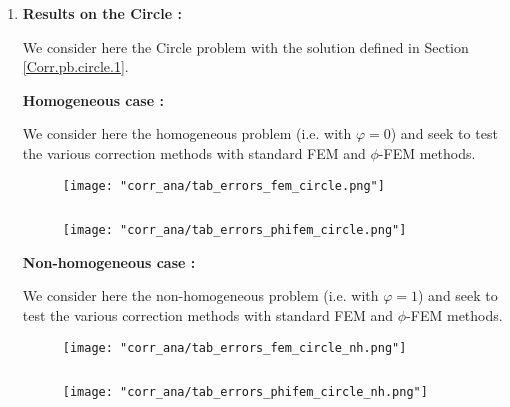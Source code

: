 \begin{enumerate}[label=\textbullet]
	\item \textbf{Results on the Circle :}
	
	We consider here the Circle problem with the solution defined in Section \ref{Corr.pb.circle.1}.
	
	\newpage
	
	\textbf{Homogeneous case :}
	
	We consider here the homogeneous problem (i.e. with $\varphi=0$) and seek to test the various correction methods with standard FEM and $\phi$-FEM methods.
	
	\begin{minipage}{0.48\linewidth}
		\begin{figure}[H]
			\centering
			\texttt{[image: "corr\_ana/tab\_errors\_fem\_circle.png"]}
			\label{tab_errors_fem_circle}
		\end{figure} 
	\end{minipage} $\qquad$
	\begin{minipage}{0.48\linewidth} \qquad 
		\begin{figure}[H]
			\centering
			\texttt{[image: "corr\_ana/tab\_errors\_phifem\_circle.png"]}
			\label{tab_errors_phifem_circle}
		\end{figure} 
	\end{minipage}
	
	\textbf{Non-homogeneous case :}
	
	We consider here the non-homogeneous problem (i.e. with $\varphi=1$) and seek to test the various correction methods with standard FEM and $\phi$-FEM methods.
	
	\begin{minipage}{0.48\linewidth}
		\begin{figure}[H]
			\centering
			\texttt{[image: "corr\_ana/tab\_errors\_fem\_circle\_nh.png"]}
			\label{tab_errors_fem_circle_nh}
		\end{figure} 
	\end{minipage} $\qquad$
	\begin{minipage}{0.48\linewidth} \qquad 
		\begin{figure}[H]
			\centering
			\texttt{[image: "corr\_ana/tab\_errors\_phifem\_circle\_nh.png"]}
			\label{tab_errors_phifem_circle_nh}
		\end{figure} 
	\end{minipage}
	

\end{enumerate}
